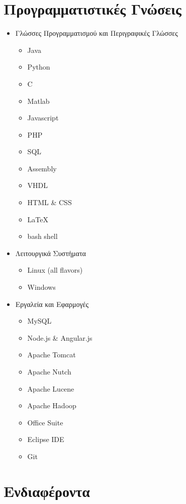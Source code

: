 \documentclass[print]{keros-cv} %
\begin{document}
\section{Προγραμματιστικές Γνώσεις}
\begin{itemize}
\item Γλώσσες Προγραμματισμού και Περιγραφικές Γλώσσες
\begin{itemize}
\item[] Java
\item[] Python
\item[] C
\item[] Matlab
\item[] Javascript
\item[] PHP
\item[] SQL
\item[] Assembly
\item[] VHDL
\item[] HTML \& CSS
\item[] LaTeX
\item[] bash shell
\end{itemize}
\item Λειτουργικά Συστήματα
\begin{itemize}
\item[] Linux (all flavors)
\item[] Windows
\end{itemize}
\item Εργαλεία και Εφαρμογές
\begin{itemize}
\item[] MySQL
\item[] Node.js \& Angular.js
\item[] Apache Tomcat
\item[] Apache Nutch
\item[] Apache Lucene
\item[] Apache Hadoop
\item[] Office Suite
\item[] Eclipse IDE
\item[] Git
\end{itemize}
\end{itemize}


\section{Ενδιαφέροντα}
\end{document}
